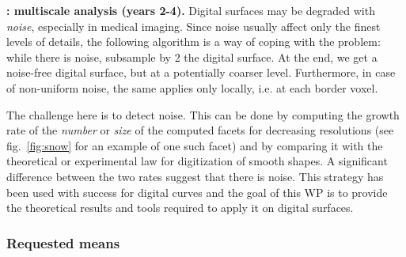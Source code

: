 \noindent\textbf{\wpScale: multiscale analysis (years 2-4).} Digital surfaces may be degraded with \emph{noise}, especially in medical imaging. Since noise usually affect only the finest levels of details, the following algorithm is a way of coping with the problem: while there is noise, subsample by 2 the digital surface. At the end, we get a noise-free digital surface, but at a potentially coarser level. Furthermore, in case of non-uniform noise, the same applies only locally, i.e. at each border voxel.  

The challenge here is to detect noise. This can be done by computing the growth rate of the \emph{number} or \emph{size} of the computed facets for decreasing resolutions (see fig.~\ref{fig:snow} for an example of one such facet) and by comparing it with the theoretical or experimental law for digitization of smooth shapes. A significant difference between the two rates suggest that there is noise. 
This strategy has been used with success for digital curves \cite{Kerautret2012} and the goal of this WP is to provide the theoretical results and tools required to apply it on digital surfaces. 


\newpage

\subsubsection{Requested means}
\label{sec:ressources}





